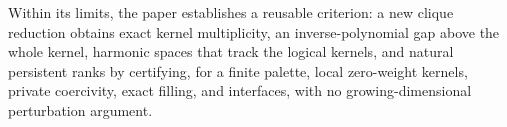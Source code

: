 Within its limits, the paper establishes a reusable criterion: a new clique
reduction obtains exact kernel multiplicity, an inverse-polynomial gap above
the whole kernel, harmonic spaces that track the logical kernels, and natural
persistent ranks by certifying, for a finite palette, local zero-weight
kernels, private coercivity, exact filling, and interfaces, with no
growing-dimensional perturbation argument.

